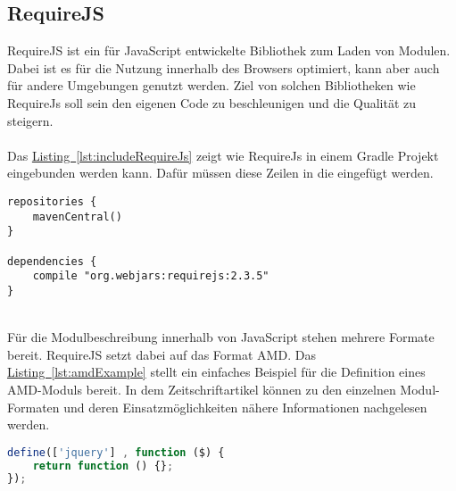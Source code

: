 \subsection{RequireJS}\label{sec:requireJs}
RequireJS \cite{requirejs} ist ein für JavaScript entwickelte Bibliothek zum Laden von Modulen. Dabei ist es für die Nutzung innerhalb des Browsers optimiert, kann aber auch für andere Umgebungen genutzt werden. Ziel von solchen Bibliotheken wie RequireJs soll sein den eigenen Code zu beschleunigen und die Qualität zu steigern.\\
\\
Das \hyperref[lst:includeRequireJs]{Listing~\ref{lst:includeRequireJs}} zeigt wie RequireJs in einem Gradle Projekt eingebunden werden kann. Dafür müssen diese Zeilen in die  eingefügt werden.\\
\begin{lstlisting}[style=lstStyleFramed, language=Gradle, caption={Einbindung der Bibliothek RequireJs mittels Gradle}, label=lst:includeRequireJs, float]
repositories {
	mavenCentral()
}

dependencies {
	compile "org.webjars:requirejs:2.3.5"
}
\end{lstlisting}
\\
Für die Modulbeschreibung innerhalb von JavaScript stehen mehrere Formate bereit. RequireJS setzt dabei auf das Format \gls{AMD}. Das \hyperref[lst:amdExample]{Listing~\ref{lst:amdExample}} stellt ein einfaches Beispiel für die Definition eines \gls{AMD}-Moduls bereit. In dem Zeitschriftartikel \cite{jsModuleDefinitions} können zu den einzelnen Modul-Formaten und deren Einsatzmöglichkeiten nähere Informationen nachgelesen werden.
\\
\begin{lstlisting}[style=lstStyleFramed, language=JavaScript, caption={Beispiel: Moduldefinition mittels AMD \cite{requirejsExample}}, label=lst:amdExample, float]
define(['jquery'] , function ($) {
	return function () {};
});
\end{lstlisting}

